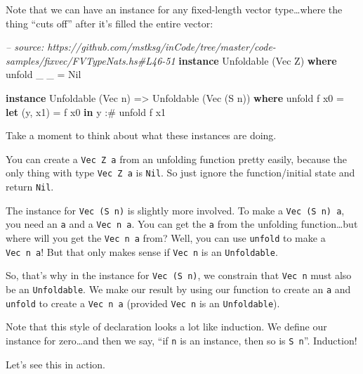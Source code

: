 \documentclass[]{article}
\newenvironment{Shaded}{}{}
\newcommand{\KeywordTok}[1]{\textcolor[rgb]{0.00,0.44,0.13}{\textbf{{#1}}}}
\newcommand{\DataTypeTok}[1]{\textcolor[rgb]{0.56,0.13,0.00}{{#1}}}
\newcommand{\CommentTok}[1]{\textcolor[rgb]{0.38,0.63,0.69}{\textit{{#1}}}}
\newcommand{\OtherTok}[1]{\textcolor[rgb]{0.00,0.44,0.13}{{#1}}}
\newcommand{\FunctionTok}[1]{\textcolor[rgb]{0.02,0.16,0.49}{{#1}}}
\newcommand{\NormalTok}[1]{{#1}}
\begin{document}
Note that we can have an instance for any fixed-length vector
type\ldots{}where the thing ``cuts off'' after it's filled the entire
vector:

\begin{Shaded}
\begin{Highlighting}[]
\CommentTok{-- source: https://github.com/mstksg/inCode/tree/master/code-samples/fixvec/FVTypeNats.hs#L46-51}
\KeywordTok{instance} \DataTypeTok{Unfoldable} \NormalTok{(}\DataTypeTok{Vec} \DataTypeTok{Z}\NormalTok{) }\KeywordTok{where}
    \NormalTok{unfold _ _ }\FunctionTok{=} \DataTypeTok{Nil}

\KeywordTok{instance} \DataTypeTok{Unfoldable} \NormalTok{(}\DataTypeTok{Vec} \NormalTok{n) }\OtherTok{=>} \DataTypeTok{Unfoldable} \NormalTok{(}\DataTypeTok{Vec} \NormalTok{(}\DataTypeTok{S} \NormalTok{n)) }\KeywordTok{where}
    \NormalTok{unfold f x0 }\FunctionTok{=} \KeywordTok{let} \NormalTok{(y, x1) }\FunctionTok{=} \NormalTok{f x0}
                  \KeywordTok{in}  \NormalTok{y }\FunctionTok{:#} \NormalTok{unfold f x1}
\end{Highlighting}
\end{Shaded}

Take a moment to think about what these instances are doing.

You can create a \texttt{Vec\ Z\ a} from an unfolding function pretty
easily, because the only thing with type \texttt{Vec\ Z\ a} is
\texttt{Nil}. So just ignore the function/initial state and return
\texttt{Nil}.

The instance for \texttt{Vec\ (S\ n)} is slightly more involved. To make
a \texttt{Vec\ (S\ n)\ a}, you need an \texttt{a} and a
\texttt{Vec\ n\ a}. You can get the \texttt{a} from the unfolding
function\ldots{}but where will you get the \texttt{Vec\ n\ a} from?
Well, you can use \texttt{unfold} to make a \texttt{Vec\ n\ a}! But that
only makes sense if \texttt{Vec\ n} is an \texttt{Unfoldable}.

So, that's why in the instance for \texttt{Vec\ (S\ n)}, we constrain
that \texttt{Vec\ n} must also be an \texttt{Unfoldable}. We make our
result by using our function to create an \texttt{a} and \texttt{unfold}
to create a \texttt{Vec\ n\ a} (provided \texttt{Vec\ n} is an
\texttt{Unfoldable}).

Note that this style of declaration looks a lot like induction. We
define our instance for zero\ldots{}and then we say, ``if \texttt{n} is
an instance, then so is \texttt{S\ n}''. Induction!

Let's see this in action.
\end{document}
